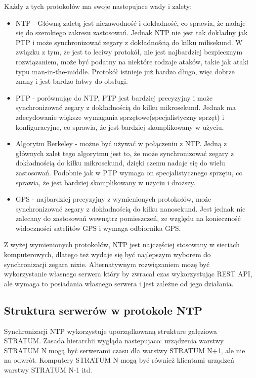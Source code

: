 \documentclass[../main.tex]{subfiles}
\begin{document}
\newpage

Każdy z tych protokołów ma swoje nastepujace wady i zalety:

\begin{itemize}
  \item NTP - Główną zaletą jest niezawodność i dokładność, co sprawia, że nadaje się do szerokiego zakresu zastosowań. 
  Jednak NTP nie jest tak dokładny jak PTP i może synchronizować zegary z dokładnością do kilku milisekund.
  W związku z tym, że jest to leciwy protokół, nie jest najbardziej bezpiecznym rozwiązaniem, 
  może być podatny na niektóre rodzaje ataków, takie jak ataki typu man-in-the-middle.
  Protokół istnieje już bardzo długo, więc dobrze znany i jest bardzo łatwy do obsługi.
  \item PTP - porównując do NTP, PTP jest bardziej precyzyjny i może synchronizować zegary z dokładnością do kilku mikrosekund.
  Jednak ma zdecydowanie większe wymagania sprzętowe(specjalistyczny sprzęt) i konfiguracyjne, co sprawia, że jest bardziej skomplikowany w użyciu.
  \item Algorytm Berkeley - możne być używać w połączeniu z NTP. 
  Jedną z głównych zalet tego algorytmu jest to, że może synchronizować zegary z dokładnością do kilku mikrosekund, dzięki czemu nadaje się do wielu zastosowań.
  Podobnie jak w PTP wymaga on specjalistycznego sprzętu, co sprawia, że jest bardziej skomplikowany w użyciu i droższy.
  \item GPS - najbardziej precyzyjny z wymienionych protokołów, może synchronizować zegary z dokładnością do kilku nanosekund.
  Jest jednak nie zalecany do zastosowań wewnątrz pomieszczeń, ze względu na konieczność widoczności satelitów GPS i wymaga odbiornika GPS.
\end{itemize} 

Z wyżej wymienionych protokołów, NTP jest najczęściej stosowany w sieciach komputerowych, dlatego też wydaje się być najlepszym wyborem do synchronizacji zegara nixie.
Alternatywnym rozwiązaniem mozę być wykorzystanie własnego serwera który by zwracał czas wykorzystując REST API, ale wymaga to posiadania własnego serwera i jest zależne od 
jego działania.

\subsection{Struktura serwerów w protokole NTP}
Synchronizacji NTP wykorzystuje uporządkowaną strukture gałęziowa STRATUM\cite{st:serwerczasu}. 
Zasada hierarchii wygląda nastepujaco: urządzenia warstwy STRATUM N mogą być serwerami czasu dla warstwy STRATUM N+1, ale nie na odwrót. 
Komputery STRATUM N mogą być również klientami urządzeń warstwy STRATUM N-1 itd.
\end{document}
